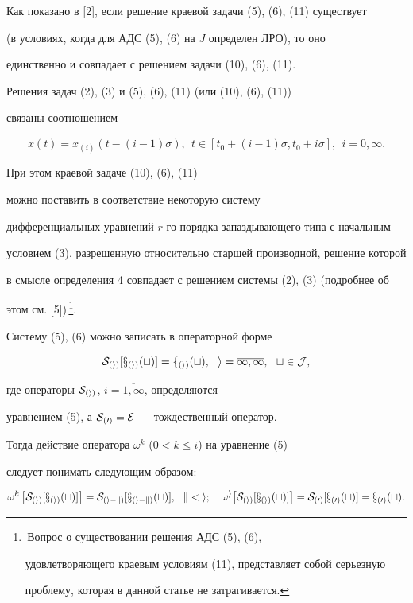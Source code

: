 Как показано в [2], если решение краевой задачи (5), (6), (11) существует 


(в условиях, когда для АДС (5), (6) на $J$ определен ЛРО), то оно 


единственно и совпадает с решением задачи (10), (6), (11).


Решения задач (2), (3) и (5), (6), (11) (или (10), (6), (11)) 


связаны соотношением


$$


x(t)=x_{(i)}(t-(i-1)\sigma ), \ \ t \in [t_0+(i-1)\sigma, t_0+i\sigma ],


\ \ i=\overline{0,\infty }.


$$


При этом краевой задаче (10), (6), (11) 


можно поставить в соответствие некоторую систему


дифференциальных уравнений $r$-го порядка запаздывающего типа с начальным


условием (3), разрешенную относительно старшей производной, решение которой 


в смысле определения 4 совпадает с решением системы (2), (3) (подробнее об


этом см. [5])\,\footnote{\,Вопрос о существовании решения АДС (5), (6), 


удовлетворяющего краевым условиям (11), представляет собой серьезную 


проблему, которая в данной статье не затрагивается.}.





\begin{note}


Систему (5), (6) можно записать в операторной форме


$$\cal S_{(i)}[x_{(i)}(t)]=f_{(i)}(t),


\ \  i=\overline{1,\infty }, \ \ t \in J,


$$


где операторы $\cal S_{(i)}$, $i=\overline{1,\infty}$, определяются


уравнением (5), а $\cal S_{(0)}=\cal E$ --- тождественный оператор.





Тогда действие оператора $\omega^k$ ($0<k \le i$) на уравнение (5) 


следует понимать следующим образом:


$$


\omega^k\left[ \cal S_{(i)}[x_{(i)}(t)]\right] =\cal S_{(i-k)}[x_{(i-k)}(t)], 


\ \ k<i; \quad


\omega^i\big[ \cal S_{(i)}[x_{(i)}(t)]\big] =\cal S_{(0)}[x_{(0)}(t)]=


x_{(0)}(t).


$$


\end{note}


